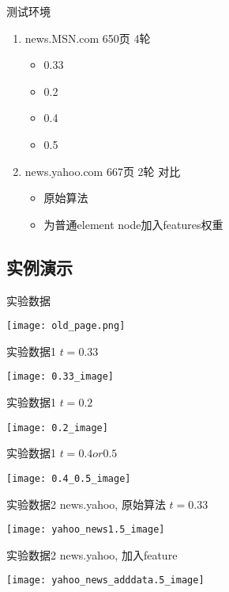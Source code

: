 \documentclass{beamer}
\begin{document}
\begin{frame}{测试环境}
    \begin{enumerate}
        \item news.MSN.com 650页 4轮
        \begin{itemize}
            \item 0.33
            \item 0.2
            \item 0.4
            \item 0.5
        \end{itemize}
                \pause
        \item news.yahoo.com 667页 2轮 对比
        \begin{itemize}
            \item 原始算法
            \item 为普通element node加入features权重
        \end{itemize}
    \end{enumerate}
\end{frame}

\subsection{实例演示}
\begin{frame}{实验数据}
    \begin{center}
    \texttt{[image: old\_page.png]}
    \end{center}
\end{frame}
\begin{frame}{实验数据1}
     $t= 0.33$
    \begin{center}
    \texttt{[image: 0.33\_image]}
    \end{center}
\end{frame}
\begin{frame}{实验数据1}
     $t= 0.2$
    \begin{center}
    \texttt{[image: 0.2\_image]}
    \end{center}
\end{frame}
\begin{frame}{实验数据1}
     $t= 0.4 or 0.5$
    \begin{center}
    \texttt{[image: 0.4\_0.5\_image]}
    \end{center}
\end{frame}
\begin{frame}{实验数据2}
     news.yahoo, 原始算法 $t=0.33$
    \begin{center}
    \texttt{[image: yahoo\_news1.5\_image]}
    \end{center}
\end{frame}
\begin{frame}{实验数据2}
     news.yahoo, 加入feature
    \begin{center}
    \texttt{[image: yahoo\_news\_adddata.5\_image]}
    \end{center}
\end{frame}
\end{document}
